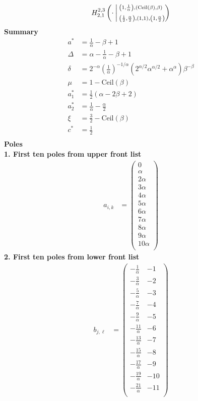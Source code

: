 \documentclass{article}
\newcommand{\FoxH}[5]{H_{#2}^{#1}\left(#3\:\middle\vert\: \begin{subarray}{l}#4\\[0.4em] #5\end{subarray}\right)}
\begin{document}
\begin{align*}
\FoxH{2,3}{2,1}{\cdot}{\left(1, \frac{1}{\alpha }\right), \left(\text{Ceil}(\beta ), \beta\right)}{\left(\frac{1}{2}, \frac{\alpha }{2}\right), \left(1, 1\right), \left(1, \frac{\alpha }{2}\right)}
\end{align*}
\noindent\textbf{Summary}
\begin{align*}
a^* &= \frac{1}{\alpha }-\beta +1 \\
\Delta &= \alpha -\frac{1}{\alpha }-\beta +1 \\
\delta &= 2^{-\alpha } \left(\frac{1}{\alpha }\right)^{-1/\alpha } \left(2^{\alpha /2} \alpha ^{\alpha /2}+\alpha ^{\alpha }\right) \beta ^{-\beta } \\
\mu &= 1-\text{Ceil}(\beta ) \\
a_1^* &= \frac{1}{2} (\alpha -2 \beta +2) \\
a_2^* &= \frac{1}{\alpha }-\frac{\alpha }{2} \\
\xi &= \frac{3}{2}-\text{Ceil}(\beta ) \\
c^* &= \frac{1}{2} \\
\end{align*}
\noindent\textbf{Poles}\\
\noindent\textbf{1. First ten poles from upper front list}
\begin{align*}
a_{i,k} &= \left(
\begin{array}{c}
 0 \\
 \alpha  \\
 2 \alpha  \\
 3 \alpha  \\
 4 \alpha  \\
 5 \alpha  \\
 6 \alpha  \\
 7 \alpha  \\
 8 \alpha  \\
 9 \alpha  \\
 10 \alpha  \\
\end{array}
\right)
\end{align*}
\noindent\textbf{2. First ten poles from lower front list}
\begin{align*}
b_{j,\ell} &= \left(
\begin{array}{cc}
 -\frac{1}{\alpha } & -1 \\
 -\frac{3}{\alpha } & -2 \\
 -\frac{5}{\alpha } & -3 \\
 -\frac{7}{\alpha } & -4 \\
 -\frac{9}{\alpha } & -5 \\
 -\frac{11}{\alpha } & -6 \\
 -\frac{13}{\alpha } & -7 \\
 -\frac{15}{\alpha } & -8 \\
 -\frac{17}{\alpha } & -9 \\
 -\frac{19}{\alpha } & -10 \\
 -\frac{21}{\alpha } & -11 \\
\end{array}
\right)
\end{align*}
\end{document}

